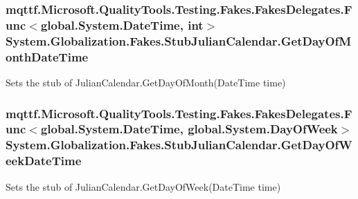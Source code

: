 \hypertarget{class_system_1_1_globalization_1_1_fakes_1_1_stub_julian_calendar_a74f8b04f919d5bd98d2880a0bebac470}{
\subsubsection[{Get\-Day\-Of\-Month\-Date\-Time}]{\setlength{\rightskip}{0pt plus 5cm}mqttf.\-Microsoft.\-Quality\-Tools.\-Testing.\-Fakes.\-Fakes\-Delegates.\-Func$<$global.\-System.\-Date\-Time, int$>$ System.\-Globalization.\-Fakes.\-Stub\-Julian\-Calendar.\-Get\-Day\-Of\-Month\-Date\-Time}}\label{class_system_1_1_globalization_1_1_fakes_1_1_stub_julian_calendar_a74f8b04f919d5bd98d2880a0bebac470}


Sets the stub of Julian\-Calendar.\-Get\-Day\-Of\-Month(\-Date\-Time time)

\hypertarget{class_system_1_1_globalization_1_1_fakes_1_1_stub_julian_calendar_a6789f7bd712a9c2485cc8df1e5c92caa}{
\subsubsection[{Get\-Day\-Of\-Week\-Date\-Time}]{\setlength{\rightskip}{0pt plus 5cm}mqttf.\-Microsoft.\-Quality\-Tools.\-Testing.\-Fakes.\-Fakes\-Delegates.\-Func$<$global.\-System.\-Date\-Time, global.\-System.\-Day\-Of\-Week$>$ System.\-Globalization.\-Fakes.\-Stub\-Julian\-Calendar.\-Get\-Day\-Of\-Week\-Date\-Time}}\label{class_system_1_1_globalization_1_1_fakes_1_1_stub_julian_calendar_a6789f7bd712a9c2485cc8df1e5c92caa}


Sets the stub of Julian\-Calendar.\-Get\-Day\-Of\-Week(\-Date\-Time time)


